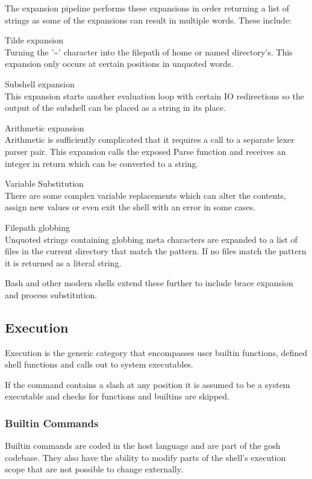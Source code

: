 The expansion pipeline performs these expansions in order returning a list of strings as some of the expansions can result in multiple words.
These include:
\begin{description*}
	\item Tilde expansion \hfill \\
    	Turning the '\textasciitilde' character into the filepath of home or named directory's.
    	This expansion only occurs at certain positions in unquoted words.
    \item Subshell expansion \hfill \\
    	This expansion starts another evaluation loop with certain IO redirections so the output of the subshell can be placed as a string in its place.
	\item Arithmetic expansion \hfill \\
    	Arithmetic is sufficiently complicated that it requires a call to a separate lexer parser pair.
        This expansion calls the exposed Parse function and receives an integer in return which can be converted to a string.
    \item Variable Substitution \hfill \\
    	There are some complex variable replacements which can alter the contents, assign new values or even exit the shell with an error in some cases.
	\item Filepath globbing \hfill \\
    	Unquoted strings containing globbing meta characters are expanded to a list of files in the current directory that match the pattern.
        If no files match the pattern it is returned as a literal string.
\end{description*}

Bash and other modern shells extend these further to include brace expansion and process substitution.

\subsection{Execution}
Execution is the generic category that encompasses user builtin functions, defined shell functions and calls out to system executables.

If the command contains a slash at any position it is assumed to be a system executable and checks for functions and builtins are skipped.

\subsubsection{Builtin Commands}
Builtin commands are coded in the host language and are part of the gosh codebase.
They also have the ability to modify parts of the shell's execution scope that are not possible to change externally.

